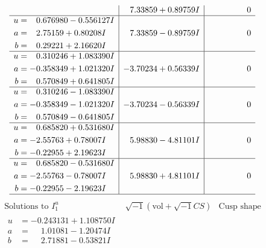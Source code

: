 \documentclass[1p]{elsarticle_modified}
\theoremstyle{definition}
\newcommand{\I}{\sqrt{-1}}
\begin{document}
$$\begin{array}{c|c|c}
 & \phantom{-}7.33859 + 0.89759 I & \phantom{-0.000000 } 0 \\ \hline\begin{aligned}
u &= \phantom{-}0.676980 - 0.556127 I \\
a &= \phantom{-}2.75159 + 0.80208 I \\
b &= \phantom{-}0.29221 + 2.16620 I\end{aligned}
 & \phantom{-}7.33859 - 0.89759 I & \phantom{-0.000000 } 0 \\ \hline\begin{aligned}
u &= \phantom{-}0.310246 + 1.083390 I \\
a &= -0.358349 + 1.021320 I \\
b &= \phantom{-}0.570849 + 0.641805 I\end{aligned}
 & -3.70234 + 0.56339 I & \phantom{-0.000000 } 0 \\ \hline\begin{aligned}
u &= \phantom{-}0.310246 - 1.083390 I \\
a &= -0.358349 - 1.021320 I \\
b &= \phantom{-}0.570849 - 0.641805 I\end{aligned}
 & -3.70234 - 0.56339 I & \phantom{-0.000000 } 0 \\ \hline\begin{aligned}
u &= \phantom{-}0.685820 + 0.531680 I \\
a &= -2.55763 + 0.78007 I \\
b &= -0.22955 + 2.19623 I\end{aligned}
 & \phantom{-}5.98830 - 4.81101 I & \phantom{-0.000000 } 0 \\ \hline\begin{aligned}
u &= \phantom{-}0.685820 - 0.531680 I \\
a &= -2.55763 - 0.78007 I \\
b &= -0.22955 - 2.19623 I\end{aligned}
 & \phantom{-}5.98830 + 4.81101 I & \phantom{-0.000000 } 0\\
 \hline 
 \end{array}$$\newpage$$\begin{array}{c|c|c}  
\text{Solutions to }I^u_{1}& \I (\text{vol} + \sqrt{-1}CS) & \text{Cusp shape}\\
 \hline 
\begin{aligned}
u &= -0.243131 + 1.108750 I \\
a &= \phantom{-}1.01081 - 1.20474 I \\
b &= \phantom{-}2.71881 - 0.53821 I\end{aligned}

\end{array}$$
\end{document}
